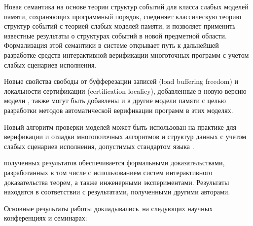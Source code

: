 {\influence} 

Новая семантика на основе теории структур событий 
для класса слабых моделей памяти, сохраняющих программный порядок,
соединяет классическую теорию структур событий 
с теорией слабых моделей памяти, и позволяет применить известные результаты 
о структурах событий в новой предметной области.  
Формализация этой семантики в системе \coq открывает 
путь к дальнейшей разработке средств 
интерактивной верификации многоточных программ  
с учетом слабых сценариев исполнения. 
 
Новые свойства свободы от буфферезации записей (load buffering freedom)
и локальности сертификации (certification localicy), 
добавленные в новую версию модели , 
также могут быть добавлены и в другие модели памяти 
с целью разработки методов автоматической верификации программ в этих моделях. 

Новый алгоритм проверки моделей может быть использован на практике
для верификации и отладки многопоточных алгоритмов и структур данных 
с учетом слабых сценариев исполнения, допустимых стандартом языка \CLANG. 

{\reliability} полученных результатов обеспечивается 
формальными доказательствами, разработанных в том числе с использованием
систем интерактивного доказательства теорем, 
а также инженерными экспериментами. 
Результаты находятся в соответствии с результатами, полученными другими авторами.

{\probation}
Основные результаты работы докладывались~на
следующих научных конференциях и семинарах:
\todo{}


